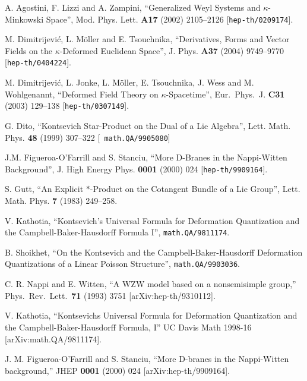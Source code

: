 \begin{thebibliography}{199}
 A. Agostini, F. Lizzi and A. Zampini, ``Generalized
  Weyl Systems and $\kappa$-Minkowski Space'', Mod. Phys. Lett. {\bf
  A17} (2002) 2105--2126 [{\tt hep-th/0209174}].

  M. Dimitrijevi\'c, L. M\"oller and E. Tsouchnika,
  ``Derivatives, Forms and Vector Fields on the $\kappa$-Deformed
  Euclidean Space'', J. Phys. {\bf A37} (2004) 9749--9770 
  [{\tt hep-th/0404224}].
  
  M. Dimitrijevi\'c, L. Jonke, L. M\"oller, E. Tsouchnika, J. Wess and
  M. Wohlgenannt,
  ``Deformed Field Theory on $\kappa$-Spacetime'',
  Eur.\ Phys.\ J. {\bf C31} (2003) 129--138
  [{\tt hep-th/0307149}].

 G. Dito, ``Kontsevich Star-Product on the Dual of a
  Lie Algebra'', Lett. Math. Phys. {\bf 48} (1999) 307--322 [{\tt
  math.QA/9905080}]

 J.M. Figueroa-O'Farrill and S. Stanciu, ``More D-Branes
  in the Nappi-Witten Background'', J. High Energy Phys. {\bf 0001}
  (2000) 024 [{\tt hep-th/9909164}].

 S. Gutt, ``An Explicit $*$-Product on the Cotangent
  Bundle of a Lie Group'', Lett. Math. Phys. {\bf 7} (1983) 249--258.

 V. Kathotia, ``Kontsevich's Universal Formula for
  Deformation Quantization and the Campbell-Baker-Hausdorff Formula
  I'', {\tt math.QA/9811174}.

 B. Shoikhet, ``On the Kontsevich and the
  Campbell-Baker-Hausdorff Deformation Quantizations of a Linear
  Poisson Structure'', {\tt math.QA/9903036}.

  C. R. Nappi and E. Witten,
  ``A WZW model based on a nonsemisimple group,''
  Phys.\ Rev.\ Lett.\  {\bf 71} (1993) 3751
  [arXiv:hep-th/9310112].

  V. Kathotia,
  ``Kontsevichs Universal Formula for Deformation Quantization and the
  Campbell-Baker-Hausdorff Formula, I''
  UC Davis Math 1998-16
  [arXiv:math.QA/9811174].

  J. M. Figueroa-O'Farrill and S. Stanciu,
  ``More D-branes in the Nappi-Witten background,''
  JHEP {\bf 0001} (2000) 024
  [arXiv:hep-th/9909164].


\end{thebibliography}
